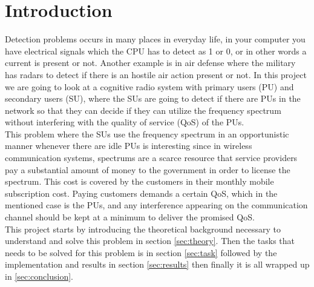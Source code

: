 \section{Introduction}\label{sec:intro}
Detection problems occurs in many places in everyday life, in your computer you have electrical signals which the CPU has to detect as 1 or 0, or in other words a current is present or not. Another example is in air defense where the military has radars to detect if there is an hostile air action present or not. In this project we are going to look at a cognitive radio system with primary users (PU) and secondary users (SU), where the SUs are going to detect if there are PUs in the network so that they can decide if they can utilize the frequency spectrum without interfering with the quality of service (QoS) of the PUs.\\
This problem where the SUs use the frequency spectrum in an opportunistic manner whenever there are idle PUs is interesting since in wireless communication systems, spectrums are a scarce resource that service providers pay a substantial amount of money to the government in order to license the spectrum. This cost is covered by the customers in their monthly mobile subscription cost. Paying customers demands a certain QoS, which in the mentioned case is the PUs, and any interference appearing on the communication channel should be kept at a minimum to deliver the promised QoS.\\
This project starts by introducing the theoretical background necessary to understand and solve this problem in section \ref{sec:theory}. Then the tasks that needs to be solved for this problem is in section \ref{sec:task} followed by the implementation and results in section \ref{sec:results} then finally it is all wrapped up in \ref{sec:conclusion}.\\


